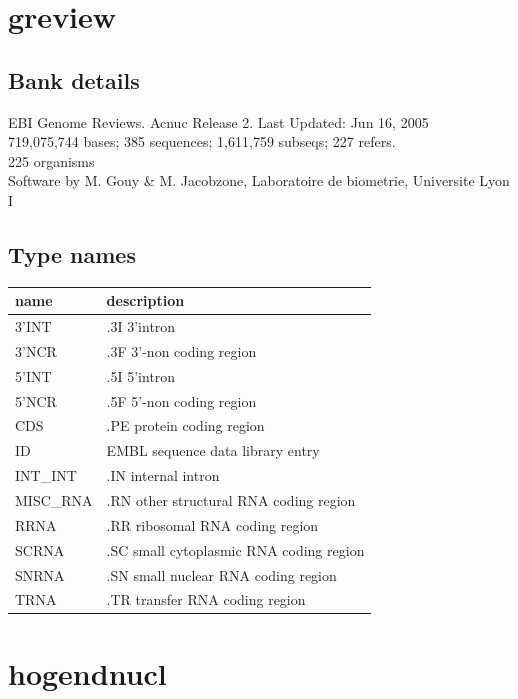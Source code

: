 \documentclass{article}
\begin{document}
\begin{Schunk}
\section{ greview }
\subsection{Bank details}
EBI Genome Reviews. Acnuc Release 2. Last Updated: Jun 16, 2005\\
719,075,744 bases; 385 sequences; 1,611,759 subseqs; 227 refers.\\
225 organisms\\
Software by M. Gouy \& M. Jacobzone, Laboratoire de biometrie, Universite Lyon I

\subsection{Type names}
\noindent\begin{tabular}{ll}
\hline \hline
name & description\\
\hline
3'INT & .3I 3'intron \\
3'NCR & .3F  3'-non coding region \\
5'INT & .5I 5'intron \\
5'NCR & .5F  5'-non coding region \\
CDS & .PE protein coding region \\
ID & EMBL sequence data library entry \\
INT\_INT & .IN  internal intron \\
MISC\_RNA & .RN other structural RNA coding region \\
RRNA & .RR ribosomal RNA coding region \\
SCRNA & .SC small cytoplasmic RNA coding region \\
SNRNA & .SN small nuclear RNA coding region \\
TRNA & .TR transfer RNA coding region \\
\hline \hline
\end{tabular}

\section{ hogendnucl }

\end{Schunk}
\end{document}
